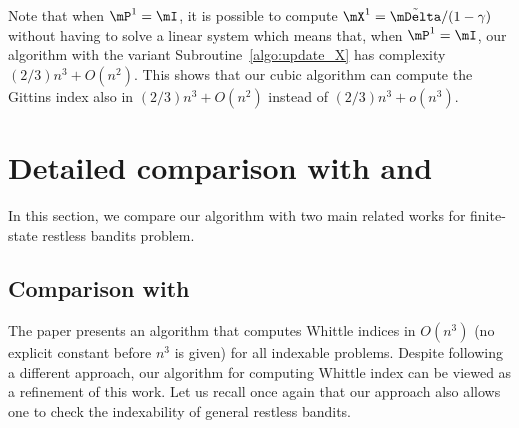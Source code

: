 Note that when $\mP^1=\mI$, it is possible to compute $\mX^1=\tilde{\mDelta}/(1-\gamma)$ without having to solve a linear system which means that, when $\mP^1=\mI$, our algorithm with the variant Subroutine~\ref{algo:update_X} has complexity $(2/3) n^3 +O(n^2)$.
This shows that our cubic algorithm can compute the Gittins index also in $(2/3) n^3 +O(n^2)$ instead of $(2/3)n^3 +o(n^3)$.

\section{Detailed comparison with \texorpdfstring{\cite{akbarzadeh2020conditions} and \cite{nino2020fast}}{Akbarzadeh et al. 2020 and Nino Mora 2020.}}
\label{ch:cpt:apx:comparison}

In this section, we compare our algorithm with two main related works for finite-state restless bandits problem.

\subsection{Comparison with \texorpdfstring{\cite{akbarzadeh2020conditions}}{Akbarzadeh2020 et al. 2022}}
The paper presents an  algorithm that computes Whittle indices  in $O(n^3)$ (no explicit constant before $n^3$ is given) for all indexable problems. Despite following a different approach, our algorithm for computing Whittle index can be viewed as a refinement of this work. Let us recall once again that our approach also allows one to check the indexability of general restless bandits.

